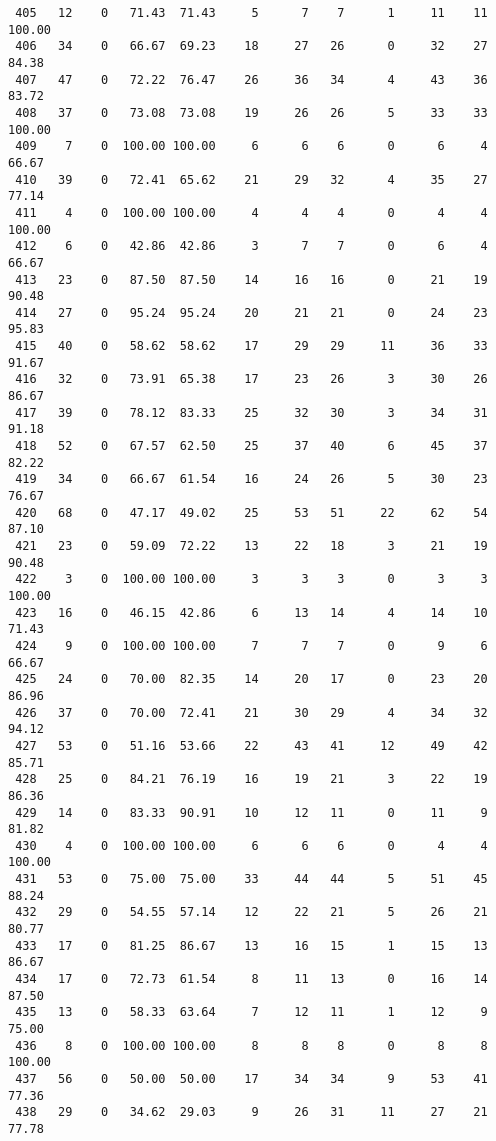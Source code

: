 \begin{verbatim}
 405   12    0   71.43  71.43     5      7    7      1     11    11   100.00
 406   34    0   66.67  69.23    18     27   26      0     32    27    84.38
 407   47    0   72.22  76.47    26     36   34      4     43    36    83.72
 408   37    0   73.08  73.08    19     26   26      5     33    33   100.00
 409    7    0  100.00 100.00     6      6    6      0      6     4    66.67
 410   39    0   72.41  65.62    21     29   32      4     35    27    77.14
 411    4    0  100.00 100.00     4      4    4      0      4     4   100.00
 412    6    0   42.86  42.86     3      7    7      0      6     4    66.67
 413   23    0   87.50  87.50    14     16   16      0     21    19    90.48
 414   27    0   95.24  95.24    20     21   21      0     24    23    95.83
 415   40    0   58.62  58.62    17     29   29     11     36    33    91.67
 416   32    0   73.91  65.38    17     23   26      3     30    26    86.67
 417   39    0   78.12  83.33    25     32   30      3     34    31    91.18
 418   52    0   67.57  62.50    25     37   40      6     45    37    82.22
 419   34    0   66.67  61.54    16     24   26      5     30    23    76.67
 420   68    0   47.17  49.02    25     53   51     22     62    54    87.10
 421   23    0   59.09  72.22    13     22   18      3     21    19    90.48
 422    3    0  100.00 100.00     3      3    3      0      3     3   100.00
 423   16    0   46.15  42.86     6     13   14      4     14    10    71.43
 424    9    0  100.00 100.00     7      7    7      0      9     6    66.67
 425   24    0   70.00  82.35    14     20   17      0     23    20    86.96
 426   37    0   70.00  72.41    21     30   29      4     34    32    94.12
 427   53    0   51.16  53.66    22     43   41     12     49    42    85.71
 428   25    0   84.21  76.19    16     19   21      3     22    19    86.36
 429   14    0   83.33  90.91    10     12   11      0     11     9    81.82
 430    4    0  100.00 100.00     6      6    6      0      4     4   100.00
 431   53    0   75.00  75.00    33     44   44      5     51    45    88.24
 432   29    0   54.55  57.14    12     22   21      5     26    21    80.77
 433   17    0   81.25  86.67    13     16   15      1     15    13    86.67
 434   17    0   72.73  61.54     8     11   13      0     16    14    87.50
 435   13    0   58.33  63.64     7     12   11      1     12     9    75.00
 436    8    0  100.00 100.00     8      8    8      0      8     8   100.00
 437   56    0   50.00  50.00    17     34   34      9     53    41    77.36
 438   29    0   34.62  29.03     9     26   31     11     27    21    77.78

\end{verbatim}
